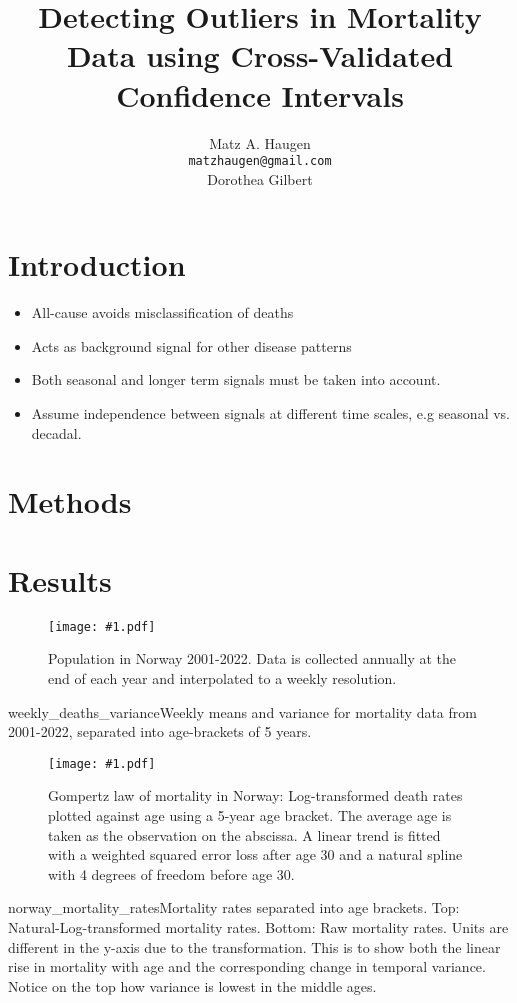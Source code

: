 \documentclass{article}
\title{Detecting Outliers in Mortality Data using Cross-Validated Confidence Intervals}
\author{Matz A. Haugen \\
\texttt{matzhaugen@gmail.com} \\
  \And
  Dorothea Gilbert \\
}
\newcommand{\insertPdfFig}[3]{
  \begin{figure}[h]
  \centering
  \texttt{[image: \#1.pdf]}
  \caption{#2}
  \label{fig:#1}
  \end{figure}
}
\newcommand{\insertSmallPdfFig}[3]{
  \begin{figure}[h]
  \centering
  \texttt{[image: \#1.pdf]}
  \caption{#2}
  \label{fig:#1}
  \end{figure}
}
\begin{document}
\maketitle

\begin{abstract}
  \lipsum[1]
\end{abstract}




\section{Introduction}

\begin{itemize}
\item All-cause avoids misclassification of deaths
\item Acts as background signal for other disease patterns
\item Both seasonal and longer term signals must be taken into account.
\item Assume independence between signals at different time scales, e.g seasonal vs. decadal.
\end{itemize}

\section{Methods}
\label{sec:methods}

\section{Results}
\label{sec:results}


\insertPdfFig{population_rates}{Population in Norway 2001-2022. Data is collected annually at the end of each year and interpolated to a weekly resolution.}

\insertPdfFig{weekly_deaths_variance}{Weekly means and variance for mortality data from 2001-2022, separated into age-brackets of 5 years.}

\insertSmallPdfFig{norway_gompertz_law_ln_mortality_rates}{Gompertz law of mortality in Norway: Log-transformed death rates plotted against age using a 5-year age bracket. The average age is taken as the observation on the abscissa. A linear trend is fitted with a weighted squared error loss after age 30 and a natural spline with 4 degrees of freedom before age 30.}


\insertPdfFig{norway_mortality_rates}{Mortality rates separated into age brackets. Top: Natural-Log-transformed mortality rates. Bottom: Raw mortality rates. Units are different in the y-axis due to the transformation. This is to show both the linear rise in mortality with age and the corresponding change in temporal variance. Notice on the top how variance is lowest in the middle ages.}
\end{document}
